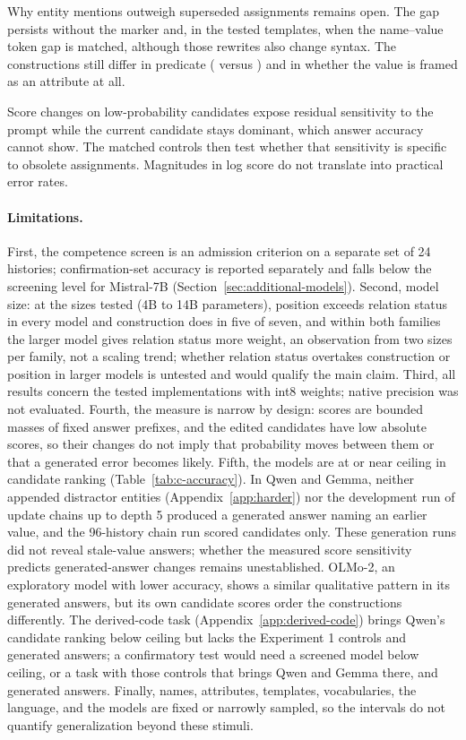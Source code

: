 Why entity mentions outweigh superseded assignments remains open. The gap persists without the marker and, in the tested templates, when the name--value token gap is matched, although those rewrites also change syntax. The constructions still differ in predicate ( versus ) and in whether the value is framed as an attribute at all.

Score changes on low-probability candidates expose residual sensitivity to the prompt while the current candidate stays dominant, which answer accuracy cannot show. The matched controls then test whether that sensitivity is specific to obsolete assignments. Magnitudes in log score do not translate into practical error rates.

\paragraph{Limitations.} First, the competence screen is an admission criterion on a separate set of 24 histories; confirmation-set accuracy is reported separately and falls below the screening level for Mistral-7B (Section~\ref{sec:additional-models}). Second, model size: at the sizes tested (4B to 14B parameters), position exceeds relation status in every model and construction does in five of seven, and within both families the larger model gives relation status more weight, an observation from two sizes per family, not a scaling trend; whether relation status overtakes construction or position in larger models is untested and would qualify the main claim. Third, all results concern the tested implementations with int8 weights; native precision was not evaluated. Fourth, the measure is narrow by design: scores are bounded masses of fixed answer prefixes, and the edited candidates have low absolute scores, so their changes do not imply that probability moves between them or that a generated error becomes likely. Fifth, the models are at or near ceiling in candidate ranking (Table~\ref{tab:c-accuracy}). In Qwen and Gemma, neither appended distractor entities (Appendix~\ref{app:harder}) nor the development run of update chains up to depth 5 produced a generated answer naming an earlier value, and the 96-history chain run scored candidates only. These generation runs did not reveal stale-value answers; whether the measured score sensitivity predicts generated-answer changes remains unestablished. OLMo-2, an exploratory model with lower accuracy, shows a similar qualitative pattern in its generated answers, but its own candidate scores order the constructions differently. The derived-code task (Appendix~\ref{app:derived-code}) brings Qwen's candidate ranking below ceiling but lacks the Experiment 1 controls and generated answers; a confirmatory test would need a screened model below ceiling, or a task with those controls that brings Qwen and Gemma there, and generated answers. Finally, names, attributes, templates, vocabularies, the language, and the models are fixed or narrowly sampled, so the intervals do not quantify generalization beyond these stimuli.
